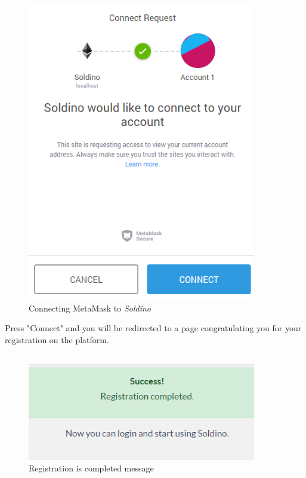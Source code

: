 	\begin{figure}[H]
		\includegraphics[width=10cm]{res/images/metamask_connect.png}
		\centering
		\caption{Connecting MetaMask to \textit{Soldino}}
	\end{figure}
	\noindent Press "Connect" and you will be redirected to a page 
	congratulating you for your registration on the platform.
	\begin{figure}[H]
		\includegraphics[width=10cm]{res/images/registration_complete.png}
		\centering
		\caption{Registration is completed message}
	\end{figure}
